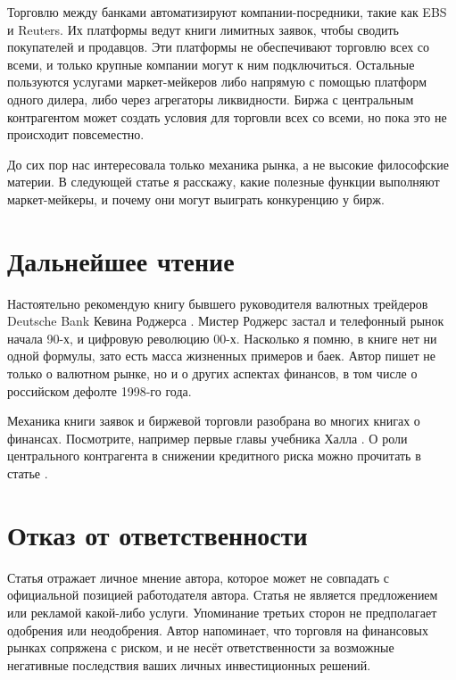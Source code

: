 Торговлю между банками автоматизируют компании-посредники, такие как EBS и
Reuters. Их платформы ведут книги лимитных заявок, чтобы сводить покупателей и
продавцов. Эти платформы не обеспечивают торговлю всех со всеми, и только
крупные компании могут к ним подключиться. Остальные пользуются услугами
маркет-мейкеров либо напрямую с помощью платформ одного дилера, либо через
агрегаторы ликвидности. Биржа с центральным контрагентом может создать условия
для торговли всех со всеми, но пока это не происходит повсеместно.

До сих пор нас интересовала только механика рынка, а не высокие философские
материи. В следующей статье я расскажу, какие полезные функции выполняют
маркет-мейкеры, и почему они могут выиграть конкуренцию у бирж.

\section*{Дальнейшее чтение}

Настоятельно рекомендую книгу бывшего руководителя валютных трейдеров Deutsche
Bank Кевина Роджерса \cite{rodgers2016why}. Мистер Роджерс застал и телефонный
рынок начала 90-х, и цифровую революцию 00-х. Насколько я помню, в книге нет ни
одной формулы, зато есть масса жизненных примеров и баек.
Автор пишет не только о валютном рынке, но и о других аспектах финансов, в том
числе о российском дефолте 1998-го года.

Механика книги заявок и биржевой торговли разобрана во многих книгах о финансах.
Посмотрите, например первые главы учебника Халла
\cite[ch.~1--2]{hull2015options}. О роли центрального контрагента в снижении
кредитного риска можно прочитать в статье \cite{domanski2015central}.

\section*{Отказ от ответственности}

Статья отражает личное мнение автора, которое может не совпадать с официальной 
позицией работодателя автора. Статья не является предложением или рекламой 
какой-либо услуги. Упоминание третьих сторон не предполагает одобрения или 
неодобрения. Автор напоминает, что торговля на финансовых рынках сопряжена 
с риском, и не несёт ответственности за возможные негативные последствия ваших 
личных инвестиционных решений.

\begin{otherlanguage}{english}
\printbibliography[title = \begin{otherlanguage}{russian}Список
литературы\end{otherlanguage}]
\end{otherlanguage}
\printendnotes

